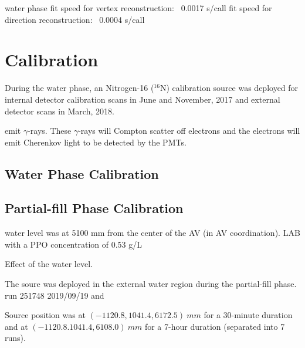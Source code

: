 water phase
fit speed for vertex reconstruction: ~0.0017 s/call
fit speed for direction reconstruction: ~0.0004 s/call








\section{ Calibration}

During the water phase, an Nitrogen-16 ($^{16}$N) calibration source was deployed for internal detector calibration scans in June and November, 2017 and external detector scans in March, 2018. 






emit $\gamma$-rays. These $\gamma$-rays will Compton scatter off electrons and the electrons will emit Cherenkov light to be detected by the PMTs.














\subsection{Water Phase Calibration}

\subsection{Partial-fill Phase Calibration}

water level was at 5100 mm from the center of the AV (in AV coordination).
LAB with a PPO concentration of 0.53 g/L  




Effect of the water level.







The  soure was deployed in the external water region during the partial-fill phase.
run 251748 2019/09/19 and 


Source position was at $(-1120.8, 1041.4, 6172.5)~ mm$ for a 30-minute duration and at $(-1120.8. 1041.4, 6108.0)~mm$ for a 7-hour duration (separated into 7 runs).
















